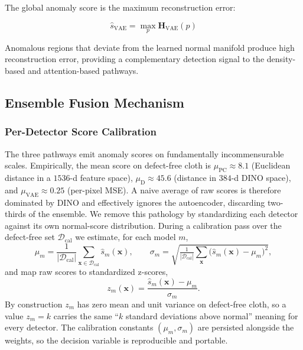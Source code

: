 \documentclass[journal]{IEEEtran}
\begin{document}
The global anomaly score is the maximum reconstruction error:

\begin{equation}
    \hat{s}_{\text{VAE}} = \max_p \mathbf{H}_{\text{VAE}}(p)
    \label{eq:vae_score}
\end{equation}

Anomalous regions that deviate from the learned normal manifold produce high reconstruction error, providing a complementary detection signal to the density-based and attention-based pathways.

\subsection{Ensemble Fusion Mechanism}
\label{sec:fusion}

\subsubsection{Per-Detector Score Calibration}
\label{sec:calibration}

The three pathways emit anomaly scores on fundamentally incommensurable scales. Empirically, the mean score on defect-free cloth is $\mu_{\text{PC}}\approx 8.1$ (Euclidean distance in a $1536$-d feature space), $\mu_{\text{D}}\approx 45.6$ (distance in $384$-d DINO space), and $\mu_{\text{VAE}}\approx 0.25$ (per-pixel MSE). A naive average of raw scores is therefore dominated by DINO and effectively ignores the autoencoder, discarding two-thirds of the ensemble. We remove this pathology by standardizing each detector against its own normal-score distribution. During a calibration pass over the defect-free set $\mathcal{D}_{\text{cal}}$ we estimate, for each model $m$,
\begin{equation}
    \mu_m = \frac{1}{|\mathcal{D}_{\text{cal}}|}\sum_{\mathbf{x}\in\mathcal{D}_{\text{cal}}} \hat{s}_m(\mathbf{x}), \qquad
    \sigma_m = \sqrt{\tfrac{1}{|\mathcal{D}_{\text{cal}}|}\sum_{\mathbf{x}} \big(\hat{s}_m(\mathbf{x})-\mu_m\big)^2},
    \label{eq:calib_stats}
\end{equation}
and map raw scores to standardized z-scores,
\begin{equation}
    z_m(\mathbf{x}) = \frac{\hat{s}_m(\mathbf{x}) - \mu_m}{\sigma_m}.
    \label{eq:zscore}
\end{equation}
By construction $z_m$ has zero mean and unit variance on defect-free cloth, so a value $z_m = k$ carries the same ``$k$ standard deviations above normal'' meaning for every detector. The calibration constants $(\mu_m,\sigma_m)$ are persisted alongside the weights, so the decision variable is reproducible and portable.
\end{document}
